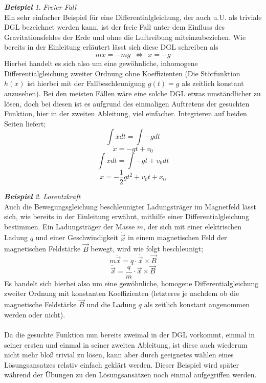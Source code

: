 \documentclass[a4paper,11pt]{article}
\theoremstyle{remark}
\newtheorem{example}{\textbf{Beispiel}}[section]
\begin{document}
\begin{example}{\textit{Freier Fall}}
\\ Ein sehr einfacher Beispiel für eine Differentialgleichung, der auch u.U. als triviale DGL bezeichnet werden kann, ist der freie Fall unter dem Einfluss des Gravitationsfeldes der Erde und ohne die Luftreibung miteinzubeziehen. Wie bereits in der Einleitung erläutert lässt sich diese DGL schreiben als 
\begin{equation}
m\ddot{x}=-mg \ \ \Leftrightarrow \ \ \ddot{x}=-g
\end{equation}
Hierbei handelt es sich also um eine gewöhnliche, inhomogene Differentialgleichung zweiter Ordnung ohne Koeffizienten (Die Störfunktion $h(x)$ ist hierbei mit der Fallbeschleunigung $g(t)=g$ als zeitlich konstant anzusehen). Bei den meisten Fällen wäre eine solche DGL etwas umständlicher zu lösen, doch bei diesen ist es aufgrund des einmaligen Auftretens der gesuchten Funktion, hier in der zweiten Ableitung, viel einfacher. Integrieren auf beiden Seiten liefert;
\begin{equation}
\int \ddot{x} dt=\int -g dt
\end{equation}
\begin{equation}
\dot{x}=-gt+v_0
\end{equation}
\begin{equation}
\int \dot{x} dt=\int -gt+v_0 dt
\end{equation}
\begin{equation}
x=-\frac{1}{2} gt^2+v_0t+x_0
\end{equation}
\end{example}
\vspace{0,5cm}
\begin{example}{\textit{Lorentzkraft}}
\\ Auch die Bewegungsgleichung beschleunigter Ladungsträger im Magnetfeld lässt sich, wie bereits in der Einleitung erwähnt, mithilfe einer Differentialgleichung bestimmen. Ein Ladungsträger der Masse $m$, der sich mit einer elektrischen Ladung $q$ und einer Geschwindigkeit $\dot{\vec{x}}$ in einem magnetischen Feld der magnetischen Feldstärke $\vec{B}$ bewegt, wird wie folgt beschleunigt;
\begin{equation}
m\ddot{\vec{x}}=q \cdot \dot{\vec{x}} \times \vec{B}
\end{equation}
\begin{equation}
\ddot{\vec{x}}=\frac{q}{m} \cdot \dot{\vec{x}} \times \vec{B}
\end{equation}
Es handelt sich hierbei also um eine gewöhnliche, homogene Differentialgleichung zweiter Ordnung mit konstanten Koeffizienten (letzteres je nachdem ob die magnetische Feldstärke $\vec{B}$ und die Ladung $q$ als zeitlich konstant angenommen werden oder nicht). \\ \\ Da die gesuchte Funktion nun bereits zweimal in der DGL vorkommt, einmal in seiner ersten und einmal in seiner zweiten Ableitung, ist diese auch wiederum nicht mehr bloß trivial zu lösen, kann aber durch geeignetes wählen eines Lösungsansatzes relativ einfach geklärt werden. Dieser Beispiel wird später während der Übungen zu den Lösungsansätzen noch einmal aufgegriffen werden. 
\end{example}
\end{document}
